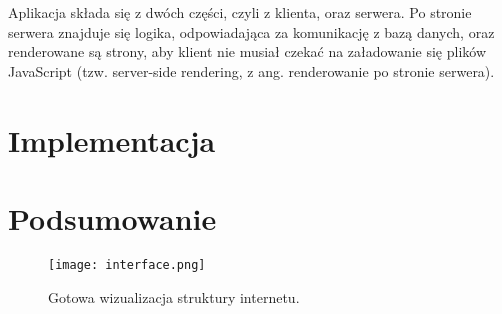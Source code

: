 \documentclass[a4paper, 12pt]{article}
\begin{document}
Aplikacja składa się z dwóch części, czyli z klienta, oraz serwera. Po stronie serwera znajduje się logika, odpowiadająca za komunikację z bazą danych, oraz renderowane są strony, aby klient nie musiał czekać na załadowanie się plików JavaScript (tzw. server-side rendering, z ang. renderowanie po stronie serwera).\cite{cloudinaryServerSideRendering}

\section{Implementacja}

\section{Podsumowanie}

\begin{figure}[H]
	\centering
	\texttt{[image: interface.png]}
	\caption{Gotowa wizualizacja struktury internetu.}
\end{figure}

\printbibliography
\listoffigures
\end{document}
